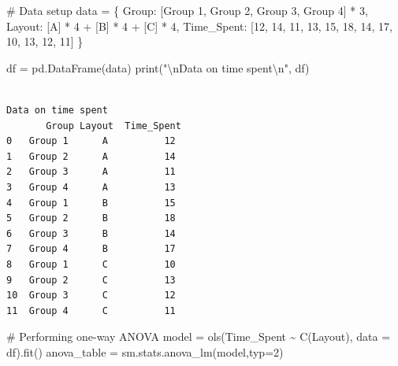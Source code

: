 \documentclass[
  letterpaper,
  DIV=11,
  numbers=noendperiod]{scrartcl}
\newenvironment{Shaded}{\begin{snugshade}}{\end{snugshade}}
\newcommand{\BuiltInTok}[1]{\textcolor[rgb]{0.00,0.23,0.31}{#1}}
\newcommand{\CharTok}[1]{\textcolor[rgb]{0.13,0.47,0.30}{#1}}
\newcommand{\CommentTok}[1]{\textcolor[rgb]{0.37,0.37,0.37}{#1}}
\newcommand{\DecValTok}[1]{\textcolor[rgb]{0.68,0.00,0.00}{#1}}
\newcommand{\NormalTok}[1]{\textcolor[rgb]{0.00,0.23,0.31}{#1}}
\newcommand{\OperatorTok}[1]{\textcolor[rgb]{0.37,0.37,0.37}{#1}}
\newcommand{\StringTok}[1]{\textcolor[rgb]{0.13,0.47,0.30}{#1}}
\begin{document}
\begin{Shaded}
\begin{Highlighting}[]
\CommentTok{\# Data setup}
\NormalTok{data }\OperatorTok{=}\NormalTok{ \{}
    \StringTok{\textquotesingle{}Group\textquotesingle{}}\NormalTok{: [}\StringTok{\textquotesingle{}Group 1\textquotesingle{}}\NormalTok{, }\StringTok{\textquotesingle{}Group 2\textquotesingle{}}\NormalTok{, }\StringTok{\textquotesingle{}Group 3\textquotesingle{}}\NormalTok{, }\StringTok{\textquotesingle{}Group 4\textquotesingle{}}\NormalTok{] }\OperatorTok{*} \DecValTok{3}\NormalTok{,}
    \StringTok{\textquotesingle{}Layout\textquotesingle{}}\NormalTok{: [}\StringTok{\textquotesingle{}A\textquotesingle{}}\NormalTok{] }\OperatorTok{*} \DecValTok{4} \OperatorTok{+}\NormalTok{ [}\StringTok{\textquotesingle{}B\textquotesingle{}}\NormalTok{] }\OperatorTok{*} \DecValTok{4} \OperatorTok{+}\NormalTok{ [}\StringTok{\textquotesingle{}C\textquotesingle{}}\NormalTok{] }\OperatorTok{*} \DecValTok{4}\NormalTok{,}
    \StringTok{\textquotesingle{}Time\_Spent\textquotesingle{}}\NormalTok{: [}\DecValTok{12}\NormalTok{, }\DecValTok{14}\NormalTok{, }\DecValTok{11}\NormalTok{, }\DecValTok{13}\NormalTok{, }\DecValTok{15}\NormalTok{, }\DecValTok{18}\NormalTok{, }\DecValTok{14}\NormalTok{, }\DecValTok{17}\NormalTok{, }\DecValTok{10}\NormalTok{, }\DecValTok{13}\NormalTok{, }\DecValTok{12}\NormalTok{, }\DecValTok{11}\NormalTok{]}
\NormalTok{\}}

\NormalTok{df }\OperatorTok{=}\NormalTok{ pd.DataFrame(data)}
\BuiltInTok{print}\NormalTok{(}\StringTok{"}\CharTok{\textbackslash{}n}\StringTok{Data on time spent}\CharTok{\textbackslash{}n}\StringTok{"}\NormalTok{, df)}
\end{Highlighting}
\end{Shaded}

\begin{verbatim}

Data on time spent
       Group Layout  Time_Spent
0   Group 1      A          12
1   Group 2      A          14
2   Group 3      A          11
3   Group 4      A          13
4   Group 1      B          15
5   Group 2      B          18
6   Group 3      B          14
7   Group 4      B          17
8   Group 1      C          10
9   Group 2      C          13
10  Group 3      C          12
11  Group 4      C          11
\end{verbatim}

\begin{Shaded}
\begin{Highlighting}[]
\CommentTok{\# Performing one{-}way ANOVA}
\NormalTok{model }\OperatorTok{=}\NormalTok{ ols(}\StringTok{\textquotesingle{}Time\_Spent \textasciitilde{} C(Layout)\textquotesingle{}}\NormalTok{, data }\OperatorTok{=}\NormalTok{ df).fit()}
\NormalTok{anova\_table }\OperatorTok{=}\NormalTok{ sm.stats.anova\_lm(model,typ}\OperatorTok{=}\DecValTok{2}\NormalTok{)}
\end{Highlighting}
\end{Shaded}
\end{document}
